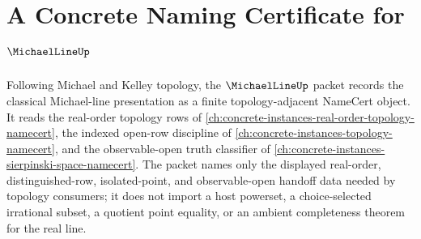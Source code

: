 \chapter{A Concrete Naming Certificate for $\MichaelLineUp$}
\label{ch:concrete-instances-michael-line-namecert}

Following Michael and Kelley topology, the $\MichaelLineUp$ packet records the classical Michael-line presentation as a finite topology-adjacent NameCert object. It reads the real-order topology rows of \autoref{ch:concrete-instances-real-order-topology-namecert}, the indexed open-row discipline of \autoref{ch:concrete-instances-topology-namecert}, and the observable-open truth classifier of \autoref{ch:concrete-instances-sierpinski-space-namecert}. The packet names only the displayed real-order, distinguished-row, isolated-point, and observable-open handoff data needed by topology consumers; it does not import a host powerset, a choice-selected irrational subset, a quotient point equality, or an ambient completeness theorem for the real line.

